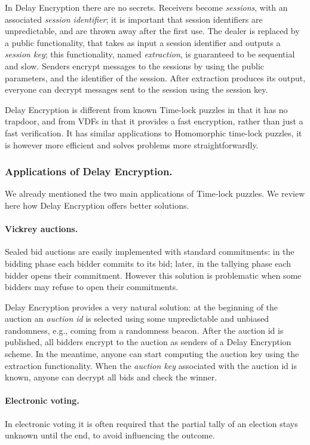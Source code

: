 \documentclass{llncs}
\begin{document}
In Delay Encryption there are no secrets. %
Receivers become \emph{sessions}, with an associated \emph{session
  identifier}; it is important that session identifiers are
unpredictable, and are thrown away after the first use. %
The dealer is replaced by a public functionality, that takes as input
a session identifier and outputs a \emph{session key}; this
functionality, named \emph{extraction}, is guaranteed to be sequential
and slow. %
Senders encrypt messages to the sessions by using the public
parameters, and the identifier of the session. %
After extraction produces its output, everyone can decrypt messages
sent to the session using the session key.

Delay Encryption is different from known Time-lock puzzles in that it
has no trapdoor, and from VDFs in that it provides a fast encryption,
rather than just a fast verification. %
It has similar applications to Homomorphic time-lock puzzles, it is
however more efficient and solves problems more straightforwardly.


\subsubsection{Applications of Delay Encryption.}

We already mentioned the two main applications of Time-lock puzzles. %
We review here how Delay Encryption offers better solutions.

\paragraph{Vickrey auctions.} 
Sealed bid auctions are easily implemented with standard commitments:
in the bidding phase each bidder commits to its bid; later, in the
tallying phase each bidder opens their commitment. %
However this solution is problematic when some bidders may refuse to
open their commitments.
   
Delay Encryption provides a very natural solution: at the beginning of
the auction an \emph{auction id} is selected using some unpredictable
and unbiased randomness, e.g., coming from a randomness beacon. %
After the auction id is published, all bidders encrypt to the auction
as senders of a Delay Encryption scheme. %
In the meantime, anyone can start computing the auction key using the
extraction functionality. %
When the \emph{auction key} associated with the auction id is known,
anyone can decrypt all bids and check the winner.

\paragraph{Electronic voting.} In electronic voting it is often
required that the partial tally of an election stays unknown until the
end, to avoid influencing the outcome. %
\end{document}
